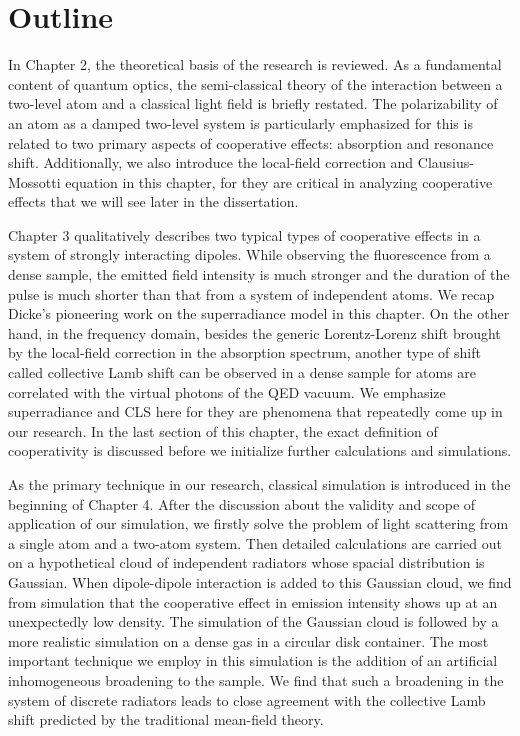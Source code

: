 \section{Outline}

In Chapter 2, the theoretical basis of the research is reviewed. As a fundamental content of quantum optics, the semi-classical theory of the interaction between a two-level atom and a classical light field is briefly restated. The polarizability of an atom as a damped two-level system is particularly emphasized for this is related to two primary aspects of cooperative effects: absorption and resonance shift. Additionally, we also introduce the local-field correction and Clausius-Mossotti equation in this chapter, for they are critical in analyzing cooperative effects that we will see later in the dissertation.

Chapter 3 qualitatively describes two typical types of cooperative effects in a system of strongly interacting dipoles. While observing the fluorescence from a dense sample, the emitted field intensity is much stronger and the duration of the pulse is much shorter than that from a system of independent atoms. We recap Dicke's pioneering work on the superradiance model in this chapter. On the other hand, in the frequency domain, besides the generic Lorentz-Lorenz shift brought by the local-field correction in the absorption spectrum, another type of shift called collective Lamb shift can be observed in a dense sample for atoms are correlated with the virtual photons of the QED vacuum. We emphasize superradiance and CLS here for they are phenomena that repeatedly come up in our research. In the last section of this chapter, the exact definition of cooperativity is discussed before we initialize further calculations and simulations.

As the primary technique in our research, classical simulation is introduced in the beginning of Chapter 4. After the discussion about the validity and scope of application of our simulation, we firstly solve the problem of light scattering from a single atom and a two-atom system. Then detailed calculations are carried out on a hypothetical cloud of independent radiators whose spacial distribution is Gaussian.  When dipole-dipole interaction is added to this Gaussian cloud, we find from simulation that the cooperative effect in emission intensity shows up at an unexpectedly low density. The simulation of the Gaussian cloud is followed by a more realistic simulation on a dense gas in a circular disk container. The most important technique we employ in this simulation is the addition of an artificial inhomogeneous broadening to the sample. We find that such a broadening in the system of discrete radiators leads to close agreement with the collective Lamb shift predicted by the traditional mean-field theory.

